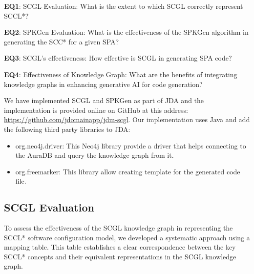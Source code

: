 \documentclass[runningheads]{llncs}
\begin{document}
\textbf{EQ1}:	SCGL Evaluation: What is the extent to which SCGL correctly represent SCCL*?

\textbf{EQ2}:	SPKGen Evaluation: What is the effectiveness of the SPKGen algorithm in generating the SCC* for a given SPA?

\textbf{EQ3}:   SCGL's effectiveness: How effective is SCGL in generating SPA code?

\textbf{EQ4}: Effectiveness of Knowledge Graph:  What are the benefits of integrating knowledge graphs in enhancing generative AI for code generation? 

We have implemented SCGL and SPKGen as part of JDA and the implementation is provided online on GitHub at this address: \url{https://github.com/jdomainapp/jdm-scgl}. Our implementation uses Java and add the following third party libraries to JDA:
\begin{itemize}
    \item org.neo4j.driver: This Neo4j library provide a driver that helps connecting to the AuraDB and query the knowledge graph from it.
    \item org.freemarker: This library allow creating template for the generated code file.
\end{itemize}

\subsection{SCGL Evaluation}
To assess the effectiveness of the SCGL knowledge graph in representing the SCCL* software configuration model, we developed a systematic approach using a mapping table. This table establishes a clear correspondence between the key SCCL* concepts and their equivalent representations in the SCGL knowledge graph.
\end{document}
